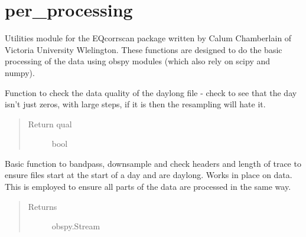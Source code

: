 \documentclass[a4paper,10pt,english]{sphinxmanual}
\begin{document}
\section{per\_processing}
\label{modules:per-processing}\label{modules:module-pre_processing}
Utilities module for the EQcorrscan package written by Calum Chamberlain of
Victoria University Wlelington.  These functions are designed to do the basic
processing of the data using obspy modules (which also rely on scipy and numpy).

\begin{fulllineitems}
\label{modules:pre_processing._check_daylong}
Function to check the data quality of the daylong file - check to see that
the day isn't just zeros, with large steps, if it is then the resampling will
hate it.
\begin{quote}\begin{description}
\item[{Return qual}] \leavevmode
bool

\end{description}\end{quote}

\end{fulllineitems}


\begin{fulllineitems}
\label{modules:pre_processing.dayproc}
Basic function to bandpass, downsample and check headers and length of trace
to ensure files start at the start of a day and are daylong.  Works in place
on data.  This is employed to ensure all parts of the data are processed
in the same way.
\begin{quote}\begin{description}
\item[{Returns}] \leavevmode
obspy.Stream

\end{description}\end{quote}

\end{fulllineitems}

\end{document}
